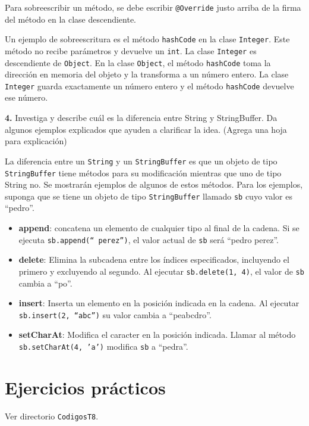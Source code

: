 \documentclass{article}
\begin{document}
Para sobreescribir un método, se debe escribir \texttt{@Override} justo arriba de la firma del método en la clase descendiente.

Un ejemplo de sobreescritura es el método \texttt{hashCode} en la clase \texttt{Integer}. Este método no recibe parámetros y devuelve un \texttt{int}. La clase \texttt{Integer} es descendiente de \texttt{Object}. En la clase \texttt{Object}, el método \texttt{hashCode} toma la dirección en memoria del objeto y la transforma a un número entero. La clase \texttt{Integer} guarda exactamente un número entero y el método \texttt{hashCode} devuelve ese número.

\vspace{5mm}

\textbf{4.} Investiga y describe cuál es la diferencia entre String y StringBuffer. Da algunos ejemplos explicados que ayuden a clarificar la idea. (Agrega una hoja para explicación)

La diferencia entre un \texttt{String} y un \texttt{StringBuffer} es que un objeto de tipo \texttt{StringBuffer} tiene métodos para su modificación mientras que uno de tipo String no. Se mostrarán ejemplos de algunos de estos métodos. Para los ejemplos, suponga que se tiene un objeto de tipo \texttt{StringBuffer} llamado \texttt{sb} cuyo valor es ``pedro''.

\begin{itemize}
\item \textbf{append}: concatena un elemento de cualquier tipo al final de la cadena. Si se ejecuta \texttt{sb.append(`` perez'')}, el valor actual de \texttt{sb} será ``pedro perez''.
\item \textbf{delete}: Elimina la subcadena entre los índices especificados, incluyendo el primero y excluyendo al segundo. Al ejecutar \texttt{sb.delete(1, 4)}, el valor de \texttt{sb} cambia a ``po''.
\item \textbf{insert}: Inserta un elemento en la posición indicada en la cadena. Al ejecutar \texttt{sb.insert(2, ``abc'')} su valor cambia a ``peabcdro''.
\item \textbf{setCharAt}: Modifica el caracter en la posición indicada. Llamar al método \texttt{sb.setCharAt(4, 'a')} modifica \texttt{sb} a ``pedra''.
\end{itemize}

\section{Ejercicios prácticos}

Ver directorio \texttt{CodigosT8}.
\end{document}
